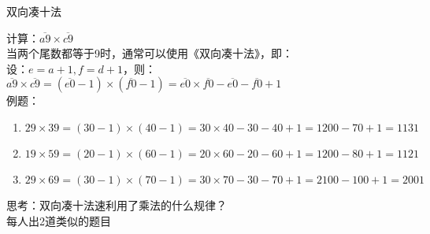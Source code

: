 \documentclass[aspectratio=169]{ctexbeamer} %
\begin{document}
\begin{frame}[t]{双向凑十法}
\begin{spacing}{1.2}
\normalsize
计算：$\overline{a9} \times \overline{c9}$ \\
当两个尾数都等于9时，通常可以使用《双向凑十法》，即：\\
设：$e = a+1, f = d+1$，则：\\
$\overline{a9} \times \overline{c9} = (\overline{e0}-1) \times (\overline{f0} - 1)  = \overline{e0} \times \overline{f0} - \overline{e0} - \overline{f0} + 1$ \\
例题：
\begin{enumerate}[label={\arabic*.}]
\item $29 \times 39  = (30-1) \times (40-1) = 30 \times 40 - 30 - 40 + 1=1200-70+1=1131$
\item $19 \times 59  = (20 -1) \times (60-1) = 20 \times 60 - 20 - 60 + 1=1200-80+1=1121$
\item $29 \times 69  = (30 -1) \times (70-1) = 30 \times 70 - 30 - 70 + 1=2100-100+1=2001$
\end{enumerate}
\alert{思考：双向凑十法速利用了乘法的什么规律？}\\
\alert{每人出2道类似的题目} 
\end{spacing}
\end{frame}
\end{document}
